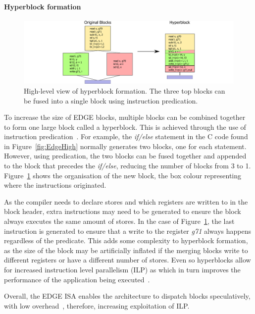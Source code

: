 \paragraph*{Hyperblock formation}
\begin{figure}[t]
    \centering
    \includegraphics[width=1\textwidth]{background/graphics/hyperblock.pdf}
    \caption{High-level view of hyperblock formation. The three top blocks can be fused into a single block using instruction predication.}
    \label{fig:EdgeHB}
\end{figure}
To increase the size of EDGE blocks, multiple blocks can be combined together to form one large block called a hyperblock.
This is achieved through the use of instruction predication~\cite{smith2006edge}.
For example, the \textit{if/else} statement in the C code found in Figure~\ref{fig:EdgeHigh} normally generates two blocks, one for each statement.
However, using predication, the two blocks can be fused together and appended to the block that precedes the \textit{if/else}, reducing the number of blocks from 3 to 1.
Figure~\ref{fig:EdgeHB} shows the organisation of the new block, the box colour representing where the instructions originated.

As the compiler needs to declare stores and which registers are written to in the block header, extra instructions may need to be generated to ensure the block always executes the same amount of stores.
In the case of Figure~\ref{fig:EdgeHB}, the last instruction is generated to ensure that a write to the register \textit{g71} always happens regardless of the predicate.
This adds some complexity to hyperblock formation, as the size of the block may be artificially inflated if the merging blocks write to different registers or have a different number of stores.
Even so hyperblocks allow for increased instruction level parallelism (ILP) as  which in turn improves the performance of the application being executed~\cite{smith2006edge}.

Overall, the EDGE ISA enables the architecture to dispatch blocks speculatively, with low overhead~\cite{putnam2010e2,kim2007tflex}, therefore, increasing exploitation of ILP.

